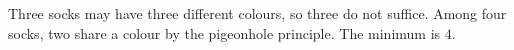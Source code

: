 Three socks may have three different colours, so three do not suffice. Among four socks, two share a colour by the pigeonhole principle. The minimum is $\boxed4$.
